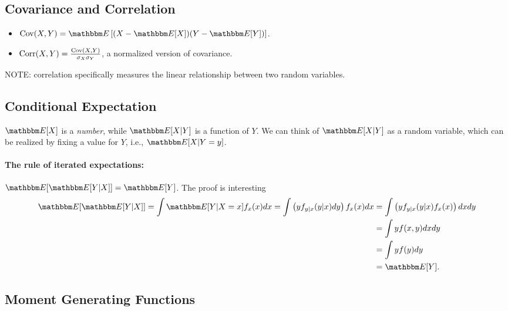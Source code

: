 \subsection{Covariance and Correlation}
    \begin{itemize}
        \item $\Cov(X, Y) = \E\left[ (X - \E[X]) (Y - \E[Y])\right]$.
        \item $\text{Corr}(X, Y) = \frac{\text{Cov}(X, Y)}{\sigma_X \sigma_Y}$, a normalized version of covariance.
    \end{itemize}
NOTE: correlation specifically measures the linear relationship between two random variables. 
    
\subsection{Conditional Expectation}
    $\E[X]$ is a \emph{number}, while $\E[X | Y]$ is a function of $Y$.
    We can think of $\E[X|Y]$ as a random variable, which can be realized by fixing a value for $Y$, i.e., $\E[X | Y=y]$.
    \paragraph{The rule of iterated expectations:} $\E[\E[Y | X]] = \E[Y]$.
    The proof is interesting
        \begin{equation}
            \begin{aligned}
                    \E[\E[Y|X]] = \int \E[Y|X=x] f_x(x) dx = \int \left(y f_{y|x}(y|x) dy\right) f_x(x) dx & = \int \left( y f_{y|x}(y|x) f_x(x)\right)dx dy \\
                    & = \int y f(x, y)  dx dy \\
                    & = \int y f(y) dy \\
                    & = \E[Y].
            \end{aligned}
        \end{equation}

\subsection{Moment Generating Functions}
    
    

